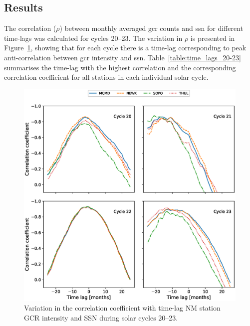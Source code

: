 \subsection{Results}

The correlation ($\rho$) between monthly averaged \gls{gcr} counts and \gls{ssn} for different time-lags was calculated for cycles 20--23. The variation in $\rho$ is presented in Figure~\ref{fig:time_lags_20-23}, showing that for each cycle there is a time-lag corresponding to peak anti-correlation between \gls{gcr} intensity and \gls{ssn}. Table~\ref{table:time_lags_20-23} summarises the time-lag with the highest correlation and the corresponding correlation coefficient for all stations in each individual solar cycle.


\begin{figure}[ht!]
	\includegraphics[width=\columnwidth]{Lag.eps}
	\caption{Variation in the correlation coefficient with time-lag NM station GCR intensity and SSN during solar cycles 20--23.}
	\label{fig:time_lags_20-23}
\end{figure}


